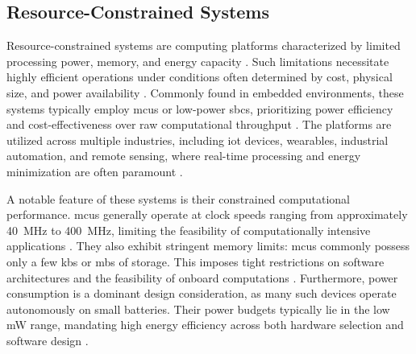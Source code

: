 \subsection{Resource-Constrained Systems}
\label{subsec:resourceConstrained}

Resource-constrained systems are computing platforms characterized by limited processing power, memory, and energy capacity \cite{brancoMachineLearningResourceScarce2019, banburyBenchmarkingTinyMLSystems2021}. Such limitations necessitate highly efficient operations under conditions often determined by cost, physical size, and power availability \cite{duttaTinyMLMeetsIoT2021}. Commonly found in embedded environments, these systems typically employ \glspl{mcu} or low-power \glspl{sbc}, prioritizing power efficiency and cost-effectiveness over raw computational throughput \cite{duttaTinyMLMeetsIoT2021, capogrossoMachineLearningOrientedSurvey2024}. The platforms are utilized across multiple industries, including \gls{iot} devices, wearables, industrial automation, and remote sensing, where real-time processing and energy minimization are often paramount \cite{capogrossoMachineLearningOrientedSurvey2024}.

A notable feature of these systems is their constrained computational performance. \glspl{mcu} generally operate at clock speeds ranging from approximately \SI{40}{\mega\hertz} to \SI{400}{\mega\hertz}, limiting the feasibility of computationally intensive applications \cite{capogrossoMachineLearningOrientedSurvey2024,linMCUNetTinyDeep2020a}. They also exhibit stringent memory limits: \glspl{mcu} commonly possess only a few \glspl{kb} or \glspl{mb} of storage. This imposes tight restrictions on software architectures and the feasibility of onboard computations \cite{capogrossoMachineLearningOrientedSurvey2024,linMCUNetTinyDeep2020a}. Furthermore, power consumption is a dominant design consideration, as many such devices operate autonomously on small batteries. Their power budgets typically lie in the low \si{\milli\watt} range, mandating high energy efficiency across both hardware selection and software design \cite{immonenTinyMachineLearning2022, capogrossoMachineLearningOrientedSurvey2024}.

